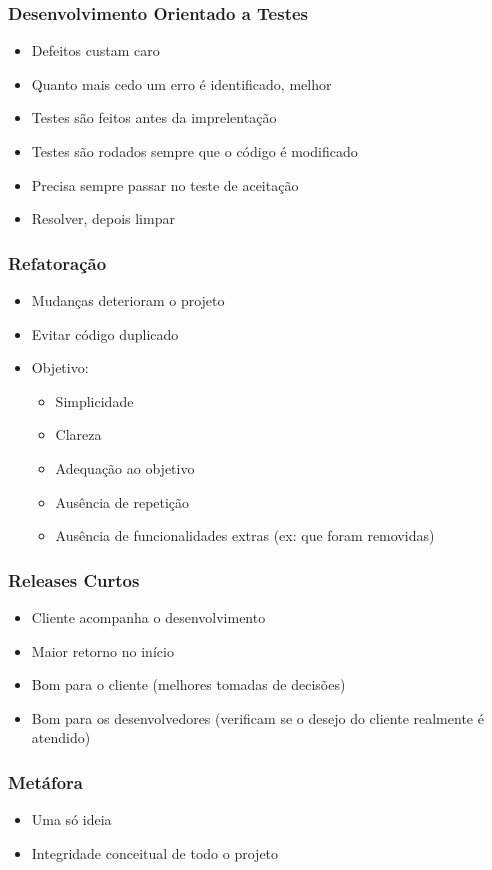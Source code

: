 \documentclass[10pt]{beamer}
\begin{document}
\begin{frame}
  \frametitle{Desenvolvimento Orientado a Testes}
  \begin{itemize}
  \item Defeitos custam caro
  \item Quanto mais cedo um erro é identificado, melhor
  \item Testes são feitos antes da imprelentação
  \item Testes são rodados sempre que o código é modificado
  \item Precisa sempre passar no teste de aceitação
  \item Resolver, depois limpar
  \end{itemize}
\end{frame}

\begin{frame}
  \frametitle{Refatoração}
  \begin{itemize}
  \item Mudanças deterioram o projeto
  \item Evitar código duplicado
  \item Objetivo:
  \begin{itemize}
    \item Simplicidade
    \item Clareza
    \item Adequação ao objetivo
    \item Ausência de repetição
    \item Ausência de funcionalidades extras (ex: que foram removidas)
  \end{itemize}
  \end{itemize}
\end{frame}

\begin{frame}
  \frametitle{Releases Curtos}
  \begin{itemize}
  \item Cliente acompanha o desenvolvimento
  \item Maior retorno no início
  \item Bom para o cliente (melhores tomadas de decisões)
  \item Bom para os desenvolvedores (verificam se o desejo do cliente realmente é atendido)
  \end{itemize}
\end{frame}

\begin{frame}
  \frametitle{Metáfora}
  \begin{itemize}
  \item Uma só ideia
  \item Integridade conceitual de todo o projeto
  \end{itemize}
\end{frame}
\end{document}
